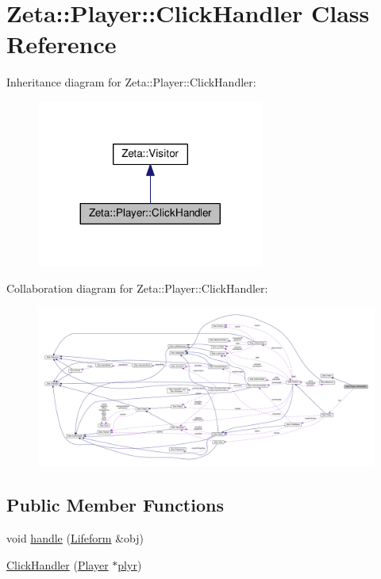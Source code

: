 \hypertarget{classZeta_1_1Player_1_1ClickHandler}{\section{Zeta\+:\+:Player\+:\+:Click\+Handler Class Reference}
\label{classZeta_1_1Player_1_1ClickHandler}
}


Inheritance diagram for Zeta\+:\+:Player\+:\+:Click\+Handler\+:\nopagebreak
\begin{figure}[H]
\begin{center}
\leavevmode
\includegraphics[width=212pt]{classZeta_1_1Player_1_1ClickHandler__inherit__graph}
\end{center}
\end{figure}


Collaboration diagram for Zeta\+:\+:Player\+:\+:Click\+Handler\+:
\nopagebreak
\begin{figure}[H]
\begin{center}
\leavevmode
\includegraphics[width=350pt]{classZeta_1_1Player_1_1ClickHandler__coll__graph}
\end{center}
\end{figure}
\subsection*{Public Member Functions}
\begin{DoxyCompactItemize}
\item 
void \hyperlink{classZeta_1_1Player_1_1ClickHandler_a0f5e769cd7bfac2c905c59dc368a4dd2}{handle} (\hyperlink{classZeta_1_1Lifeform}{Lifeform} \&obj)
\item 
\hyperlink{classZeta_1_1Player_1_1ClickHandler_a94ee26832ceade6648e924636a7c5dc3}{Click\+Handler} (\hyperlink{classZeta_1_1Player}{Player} $\ast$\hyperlink{classZeta_1_1Player_1_1ClickHandler_a638644f469abeffdba719060f509049c}{plyr})
\end{DoxyCompactItemize}
